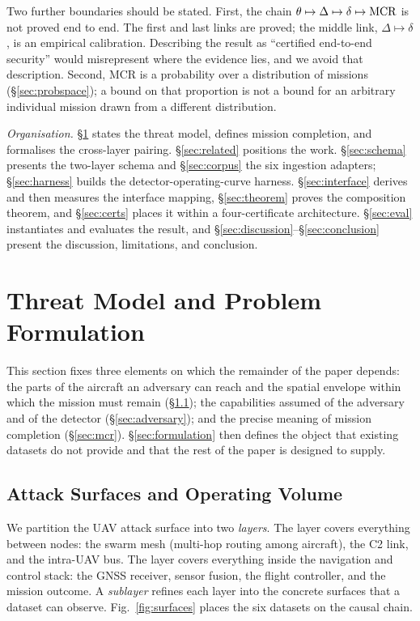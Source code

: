 Two further boundaries should be stated. First, the chain
$\theta\mapsto\Delta\mapsto\delta\mapsto\mathrm{MCR}$ is not proved end to end. The
first and last links are proved; the middle link, $\Delta\mapsto\delta$, is an
empirical calibration. Describing the result as ``certified end-to-end
security'' would misrepresent where the evidence lies, and we avoid that
description. Second, MCR is a probability over a distribution of missions
(\S\ref{sec:probspace}); a bound on that proportion is not a bound for an
arbitrary individual mission drawn from a different distribution.

\emph{Organisation.}
\S\ref{sec:problem} states the threat model, defines mission completion, and
formalises the cross-layer pairing. \S\ref{sec:related} positions the work.
\S\ref{sec:schema} presents the two-layer schema and \S\ref{sec:corpus} the six
ingestion adapters; \S\ref{sec:harness} builds the detector-operating-curve
harness. \S\ref{sec:interface} derives and then measures the interface mapping,
\S\ref{sec:theorem} proves the composition theorem, and \S\ref{sec:certs}
places it within a four-certificate architecture. \S\ref{sec:eval} instantiates
and evaluates the result, and
\S\ref{sec:discussion}--\S\ref{sec:conclusion} present the discussion,
limitations, and conclusion.

\section{Threat Model and Problem Formulation}
\label{sec:problem}
This section fixes three elements on which the remainder of the paper depends:
the parts of the aircraft an adversary can reach and the spatial envelope within
which the mission must remain (\S\ref{sec:surfaces}); the capabilities assumed
of the adversary and of the detector (\S\ref{sec:adversary}); and the precise
meaning of mission completion (\S\ref{sec:mcr}). \S\ref{sec:formulation} then
defines the object that existing datasets do not provide and that the rest of
the paper is designed to supply.

\subsection{Attack Surfaces and Operating Volume}
\label{sec:surfaces}
We partition the UAV attack surface into two \emph{layers}. The \layernet{}
layer covers everything between nodes: the swarm mesh (multi-hop routing among
aircraft), the C2 link, and the intra-UAV bus. The \layerauto{} layer covers
everything inside the navigation and control stack: the GNSS receiver, sensor
fusion, the flight controller, and the mission outcome. A \emph{sublayer}
refines each layer into the concrete surfaces that a dataset can observe.
Fig.~\ref{fig:surfaces} places the six datasets on the causal chain.

